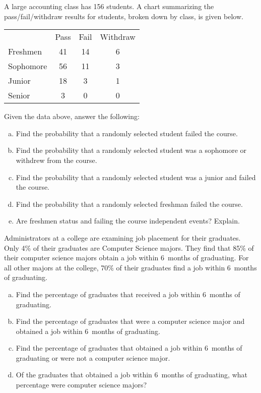 \documentclass[11pt,letterpaper]{article}
\begin{document}
\newpage



 A large accounting class has 156 students. A chart summarizing the pass/fail/withdraw results for students, broken down by class, is given below. \par
	\begin{table}[H]
	\centering
	\begin{tabular}{lccc}
	& Pass & Fail & Withdraw \\ \cline{2-4} 
	\multicolumn{1}{l|}{Freshmen} & \multicolumn{1}{c|}{41} & \multicolumn{1}{c|}{14} & \multicolumn{1}{c|}{6} \\ \cline{2-4} 
	\multicolumn{1}{l|}{Sophomore} & \multicolumn{1}{c|}{56} & \multicolumn{1}{c|}{11} & \multicolumn{1}{c|}{3} \\ \cline{2-4} 
	\multicolumn{1}{l|}{Junior} & \multicolumn{1}{c|}{18} & \multicolumn{1}{c|}{3} & \multicolumn{1}{c|}{1} \\ \cline{2-4} 
	\multicolumn{1}{l|}{Senior} & \multicolumn{1}{c|}{3} & \multicolumn{1}{c|}{0} & \multicolumn{1}{c|}{0} \\ \cline{2-4} 
	\end{tabular}
	\end{table} \pspace
Given the data above, answer the following:
	\begin{enumerate}[(a)]
	\item Find the probability that a randomly selected student failed the course.
	\item Find the probability that a randomly selected student was a sophomore or withdrew from the course.
	\item Find the probability that a randomly selected student was a junior and failed the course.
	\item Find the probability that a randomly selected freshman failed the course.
	\item Are freshmen status and failing the course independent events? Explain. 
	\end{enumerate}



\newpage



 Administrators at a college are examining job placement for their graduates. Only 4\% of their graduates are Computer Science majors. They find that 85\% of their computer science majors obtain a job within 6~months of graduating. For all other majors at the college, 70\% of their graduates find a job within 6~months of graduating. 
	\begin{enumerate}[(a)]
	\item Find the percentage of graduates that received a job within 6~months of graduating. 
	\item Find the percentage of graduates that were a computer science major and obtained a job within 6~months of graduating.
	\item Find the percentage of graduates that obtained a job within 6~months of graduating or were not a computer science major. 
	\item Of the graduates that obtained a job within 6~months of graduating, what percentage were computer science majors?	
	\end{enumerate}
\end{document}
